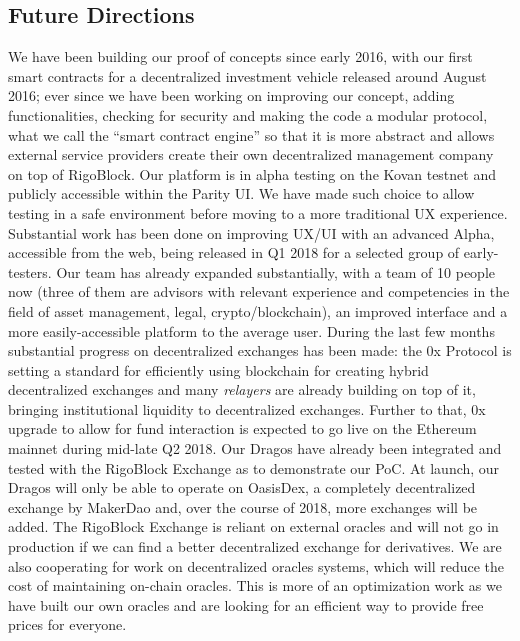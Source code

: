 \documentclass[9pt,oneside]{amsart}
\begin{document}
\begin{multicols}{2}
\section{Future Directions} \label{ch:future}
We have been building our proof of concepts since early 2016, with our first smart contracts for a decentralized investment vehicle released around August 2016; ever since we have been working on improving our concept, adding functionalities, checking for security and making the code a modular protocol, what we call the “smart contract engine” so that it is more abstract and allows external service providers create their own decentralized management company on top of RigoBlock. Our platform is in alpha testing on the Kovan testnet and publicly accessible within the Parity UI. We have made such choice to allow testing in a safe environment before moving to a more traditional UX experience.
Substantial work has been done on improving UX/UI with an advanced Alpha, accessible from the web, being released in Q1 2018 for a selected group of early-testers. Our team has already expanded substantially, with a team of 10 people now (three of them are advisors with relevant experience and competencies in the field of asset management, legal, crypto/blockchain), an improved interface and a more easily-accessible platform to the average user.
During the last few months substantial progress on decentralized exchanges has been made: the 0x Protocol is setting a standard for efficiently using blockchain for creating hybrid decentralized exchanges and many \textit{relayers} are already building on top of it, bringing institutional liquidity to decentralized exchanges. Further to that, 0x upgrade to allow for fund interaction is expected to go live on the Ethereum mainnet during mid-late Q2 2018.
Our Dragos have already been integrated and tested with the RigoBlock Exchange as to demonstrate our PoC. At launch, our Dragos will only be able to operate on OasisDex, a completely decentralized exchange by MakerDao and, over the course of 2018, more exchanges will be added.
The RigoBlock Exchange is reliant on external oracles and will not go in production if we can find a better decentralized exchange for derivatives. We are also cooperating for work on decentralized oracles systems, which will reduce the cost of maintaining on-chain oracles. This is more of an optimization work as we have built our own oracles and are looking for an efficient way to provide free prices for everyone.

\end{multicols}
\end{document}
